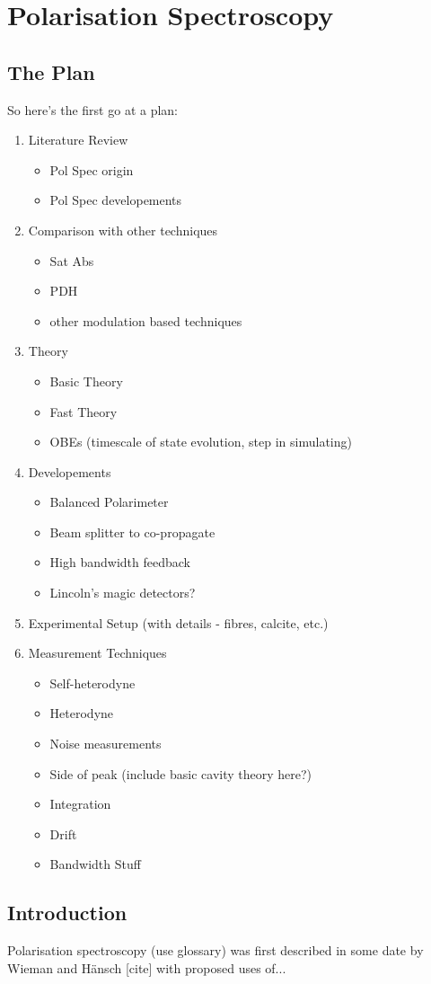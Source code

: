 \chapter{Polarisation Spectroscopy}

\section{The Plan}
So here's the first go at a plan:
\begin{enumerate}
    \item Literature Review
    \begin{itemize}
        \item Pol Spec origin
        \item Pol Spec developements
    \end{itemize}
    \item Comparison with other techniques
    \begin{itemize}
        \item Sat Abs
        \item PDH
        \item other modulation based techniques
    \end{itemize}
    \item Theory
    \begin{itemize}
        \item Basic Theory
        \item Fast Theory
        \item OBEs (timescale of state evolution, step in simulating)
    \end{itemize}
    \item Developements
    \begin{itemize}
        \item Balanced Polarimeter
        \item Beam splitter to co-propagate
        \item High bandwidth feedback
        \item Lincoln's magic detectors?
    \end{itemize}
    \item Experimental Setup (with details - fibres, calcite, etc.)
    \item Measurement Techniques
    \begin{itemize}
        \item Self-heterodyne
        \item Heterodyne
        \item Noise measurements
        \item Side of peak (include basic cavity theory here?)
        \item Integration
        \item Drift
        \item Bandwidth Stuff
    \end{itemize}
\end{enumerate}

\section{Introduction}

Polarisation spectroscopy {\color{red}(use glossary)} was first described in {\color{red}some date} by Wieman and Hänsch [cite] with proposed uses of...